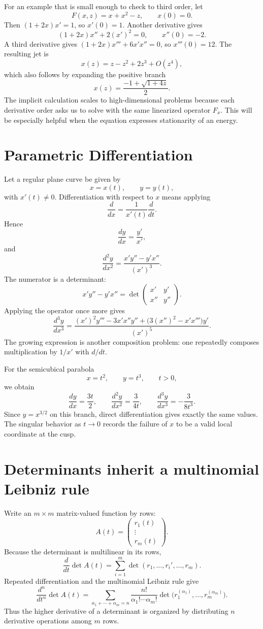 For an example that is small enough to check to third order, let
\[
 F(x,z)=x+x^2-z,\qquad x(0)=0.
\]
Then $(1+2x)x'=1$, so $x'(0)=1$. Another derivative gives
\[
 (1+2x)x''+2(x')^2=0,
 \qquad x''(0)=-2.
\]
A third derivative gives $(1+2x)x'''+6x'x''=0$, so $x'''(0)=12$. The resulting jet is
\[
 \boxed{x(z)=z-z^2+2z^3+O(z^4),}
\]
which also follows by expanding the positive branch
\[
 x(z)=\frac{-1+\sqrt{1+4z}}2.
\]
The implicit calculation scales to high-dimensional problems because each derivative order asks us to solve with the same linearized operator $F_x$. This will be especially helpful when the equation expresses stationarity of an energy.

\section{Parametric Differentiation}

Let a regular plane curve be given by
\[
  x=x(t),\qquad y=y(t),
\]
with \(x'(t)\neq0\).  Differentiation with respect to \(x\) means applying
\[
  \frac{d}{dx}=\frac1{x'(t)}\frac{d}{dt}.
\]
Hence
\[
  \frac{dy}{dx}=\frac{y'}{x'},
\]
and
\[
  \frac{d^2y}{dx^2}
  =\frac{x'y''-y'x''}{(x')^3}.
\]
The numerator is a determinant:
\[
  x'y''-y'x''
  =\det\begin{pmatrix}x'&y'\\x''&y''\end{pmatrix}.
\]
Applying the operator once more gives
\[
  \frac{d^3y}{dx^3}
  =\frac{(x')^2y'''-3x'x''y''+\bigl(3(x'')^2-x'x'''\bigr)y'}{(x')^5}.
\]
The growing expression is another composition problem: one repeatedly composes multiplication by \(1/x'\) with \(d/dt\).

For the semicubical parabola
\[
  x=t^2,\qquad y=t^3,
  \qquad t>0,
\]
we obtain
\[
  \frac{dy}{dx}=\frac{3t}{2},
  \qquad
  \frac{d^2y}{dx^2}=\frac{3}{4t},
  \qquad
  \frac{d^3y}{dx^3}=-\frac{3}{8t^3}.
\]
Since \(y=x^{3/2}\) on this branch, direct differentiation gives exactly the same values.  The singular behavior as \(t\to0\) records the failure of \(x\) to be a valid local coordinate at the cusp.

\section{Determinants inherit a multinomial Leibniz rule}

Write an \(m\times m\) matrix-valued function by rows:
\[
  A(t)=
  \begin{pmatrix}
    r_1(t)\\ \vdots\\ r_m(t)
  \end{pmatrix}.
\]
Because the determinant is multilinear in its rows,
\[
  \frac{d}{dt}\det A(t)
  =\sum_{i=1}^{m}
   \det(r_1,\ldots,r_i',\ldots,r_m).
\]
Repeated differentiation and the multinomial Leibniz rule give
\[
  \frac{d^n}{dt^n}\det A(t)
  =\sum_{\alpha_1+\cdots+\alpha_m=n}
   \frac{n!}{\alpha_1!\cdots\alpha_m!}
   \det\bigl(r_1^{(\alpha_1)},\ldots,r_m^{(\alpha_m)}\bigr).
\]
Thus the higher derivative of a determinant is organized by distributing \(n\) derivative operations among \(m\) rows.

